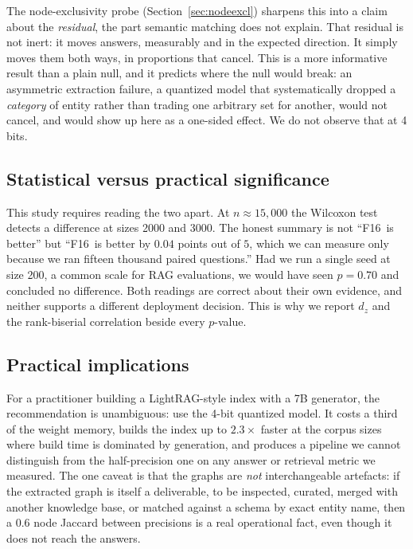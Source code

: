 \documentclass[conference, table]{IEEEtran}
\newcommand{\fsixteen}{F16}
\begin{document}
\noindent
The node-exclusivity probe (Section~\ref{sec:nodeexcl}) sharpens this into a claim about the \emph{residual}, the part semantic matching does not explain. That residual is not inert: it moves answers, measurably and in the expected direction. It simply moves them both ways, in proportions that cancel. This is a more informative result than a plain null, and it predicts where the null would break: an asymmetric extraction failure, a quantized model that systematically dropped a \emph{category} of entity rather than trading one arbitrary set for another, would not cancel, and would show up here as a one-sided effect. We do not observe that at 4 bits.

\subsection{Statistical versus practical significance}

\noindent
This study requires reading the two apart. At $n \approx 15{,}000$ the Wilcoxon test detects a difference at sizes 2000 and 3000. The honest summary is not ``\fsixteen\ is better'' but ``\fsixteen\ is better by $0.04$ points out of $5$, which we can measure only because we ran fifteen thousand paired questions.'' Had we run a single seed at size 200, a common scale for RAG evaluations, we would have seen $p = 0.70$ and concluded no difference. Both readings are correct about their own evidence, and neither supports a different deployment decision. This is why we report $d_z$ and the rank-biserial correlation beside every $p$-value.

\subsection{Practical implications}

\noindent
For a practitioner building a LightRAG-style index with a 7B generator, the recommendation is unambiguous: use the 4-bit quantized model. It costs a third of the weight memory, builds the index up to $2.3\times$ faster at the corpus sizes where build time is dominated by generation, and produces a pipeline we cannot distinguish from the half-precision one on any answer or retrieval metric we measured. The one caveat is that the graphs are \emph{not} interchangeable artefacts: if the extracted graph is itself a deliverable, to be inspected, curated, merged with another knowledge base, or matched against a schema by exact entity name, then a $0.6$ node Jaccard between precisions is a real operational fact, even though it does not reach the answers.
\end{document}

